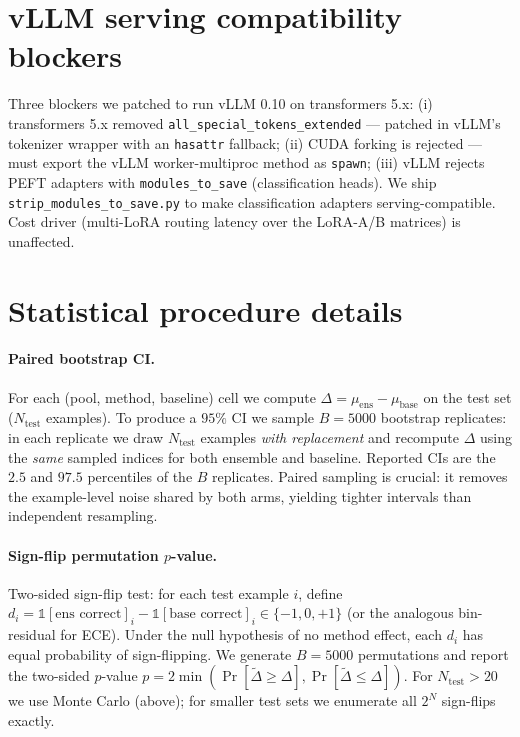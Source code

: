 \documentclass[11pt]{article}
\begin{document}
\section{vLLM serving compatibility blockers}\label{app:vllm}
{\sloppy Three blockers we patched to run vLLM 0.10 on transformers 5.x: (i) transformers 5.x removed \texttt{all\_\allowbreak special\_\allowbreak tokens\_\allowbreak extended} --- patched in vLLM's tokenizer wrapper with an \texttt{hasattr} fallback; (ii) CUDA forking is rejected --- must export the vLLM worker-multiproc method as \texttt{spawn}; (iii) vLLM rejects PEFT adapters with \texttt{modules\_to\_save} (classification heads). We ship \texttt{strip\_\allowbreak modules\_\allowbreak to\_\allowbreak save.\allowbreak py} to make classification adapters serving-compatible. Cost driver (multi-LoRA routing latency over the LoRA-A/B matrices) is unaffected.\par}

\section{Statistical procedure details}\label{app:stats}

\paragraph{Paired bootstrap CI.} For each (pool, method, baseline) cell we compute $\Delta=\mu_{\text{ens}}-\mu_{\text{base}}$ on the test set ($N_{\text{test}}$ examples). To produce a $95\%$ CI we sample $B{=}5000$ bootstrap replicates: in each replicate we draw $N_{\text{test}}$ examples \emph{with replacement} and recompute $\Delta$ using the \emph{same} sampled indices for both ensemble and baseline. Reported CIs are the $2.5$ and $97.5$ percentiles of the $B$ replicates. Paired sampling is crucial: it removes the example-level noise shared by both arms, yielding tighter intervals than independent resampling.

\paragraph{Sign-flip permutation $p$-value.} Two-sided sign-flip test: for each test example $i$, define $d_i=\mathbb{1}[\text{ens correct}]_i - \mathbb{1}[\text{base correct}]_i \in\{-1,0,+1\}$ (or the analogous bin-residual for ECE). Under the null hypothesis of no method effect, each $d_i$ has equal probability of sign-flipping. We generate $B{=}5000$ permutations and report the two-sided $p$-value $p = 2\min(\Pr[\tilde\Delta\geq\Delta], \Pr[\tilde\Delta\leq\Delta])$. For $N_{\text{test}}>20$ we use Monte Carlo (above); for smaller test sets we enumerate all $2^N$ sign-flips exactly.
\end{document}
